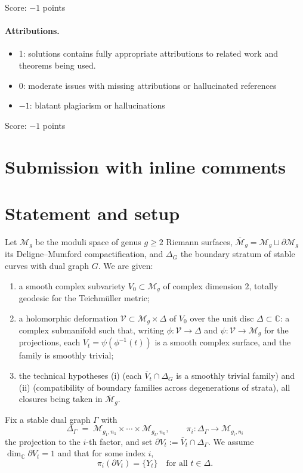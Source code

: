 \documentclass[11pt]{article}
\newcommand{\C}{\mathbb{C}}
\newcommand{\M}{\mathcal{M}}
\theoremstyle{definition}
\theoremstyle{remark}
\begin{document}
\noindent Score: $-1$ points

\paragraph{Attributions.}
\begin{itemize}
	\item  1: solutions contains fully appropriate attributions
		to related work and theorems being used.
	\item  0: moderate issues with missing attributions or hallucinated references
	\item  $-1$: blatant plagiarism or hallucinations
\end{itemize}

\noindent Score: $-1$ points

\newpage
\section{Submission with inline comments}


\section{Statement and setup}

Let $\M_g$ be the moduli space of genus $g \ge 2$ Riemann surfaces,
$\overline{\M}_g = \M_g \sqcup \partial \M_g$ its Deligne--Mumford
compactification, and $\Delta_G$ the boundary stratum of stable curves with
dual graph $G$. We are given:
\begin{enumerate}[label=(\Roman*)]
\item a smooth complex subvariety $V_0 \subset \M_g$ of complex dimension $2$,
totally geodesic for the Teichm\"uller metric;
\item a holomorphic deformation $\mathcal{V} \subset \M_g \times \Delta$ of
$V_0$ over the unit disc $\Delta \subset \C$: a complex submanifold such
that, writing $\phi : \mathcal{V} \to \Delta$ and $\psi : \mathcal{V} \to
\M_g$ for the projections, each $V_t = \psi(\phi^{-1}(t))$ is a smooth
complex surface, and the family is smoothly trivial;
\item the technical hypotheses (i) (each $\overline{V}_t \cap \Delta_G$ is a
smoothly trivial family) and (ii) (compatibility of boundary families across
degenerations of strata), all closures being taken in $\overline{\M}_g$.
\end{enumerate}
Fix a stable dual graph $\Gamma$ with
\[
\Delta_\Gamma \;=\; \M_{g_1,n_1} \times \cdots \times \M_{g_k,n_k},
\qquad \pi_i : \Delta_\Gamma \longrightarrow \M_{g_i,n_i}
\]
the projection to the $i$-th factor, and set
$\partial V_t := \overline{V}_t \cap \Delta_\Gamma$. We assume
$\dim_{\C} \partial V_t = 1$ and that for some index $i$,
\[
\pi_i(\partial V_t) = \{Y_t\} \quad \text{for all } t \in \Delta .
\]
\end{document}
